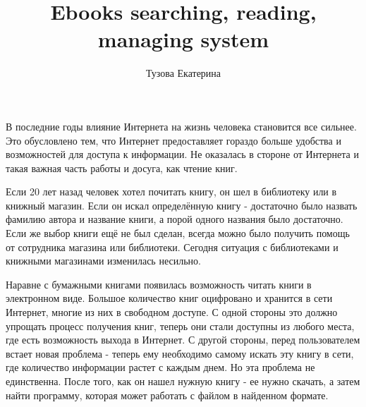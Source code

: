 \documentclass[a4paper]{report}
\begin{document}
\author{Тузова Екатерина}
\title{Ebooks searching, reading, managing system}

\maketitle



\newpage
\tableofcontents
\newpage

В последние годы влияние Интернета на жизнь человека становится все сильнее. Это обусловлено тем, что Интернет предоставляет гораздо больше удобства и возможностей для доступа к информации. Не оказалась в стороне от Интернета и такая важная часть работы и досуга, как чтение книг.

 Если 20 лет назад человек хотел почитать книгу, он шел в библиотеку или в книжный магазин. Если он искал определённую книгу - достаточно было назвать фамилию автора и название книги, а порой одного названия было достаточно. Если же выбор книги ещё не был сделан, всегда можно было получить помощь от сотрудника магазина или библиотеки. Сегодня ситуация с библиотеками и книжными магазинами изменилась несильно. 

Наравне с бумажными книгами появилась возможность читать книги в электронном виде. Большое количество книг оцифровано и хранится в сети Интернет, многие из них в свободном доступе. С одной стороны это должно упрощать процесс получения книг, теперь они стали доступны из любого места, где есть возможность выхода в Интернет. С другой стороны, перед пользователем встает новая проблема - теперь ему необходимо самому искать эту книгу в сети, где количество информации растет с каждым днем. Но эта проблема не единственна. После того, как он нашел нужную книгу - ее нужно скачать, а затем найти программу, которая может работать с файлом в найденном формате. 
\end{document}

